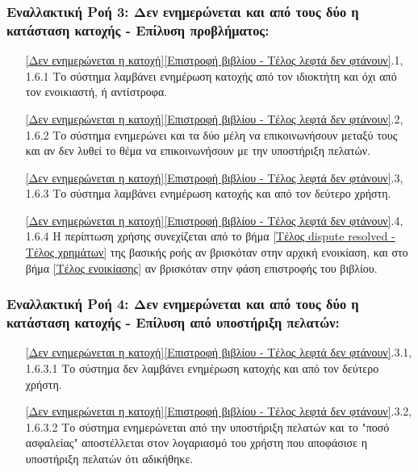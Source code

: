 \documentclass[12pt,a4paper]{article}
\begin{document}
\subsubsection*{Εναλλακτική Ροή 3: Δεν ενημερώνεται και από τους δύο η κατάσταση κατοχής - Επίλυση προβλήματος:}
\begin{enumerate}
    \item[\ref{Δεν ενημερώνεται η κατοχή}\|\ref{Επιστροφή βιβλίου - Τέλος λεφτά δεν φτάνουν}.1, 1.6.1] Το σύστημα λαμβάνει ενημέρωση κατοχής από τον ιδιοκτήτη και όχι από τον ενοικιαστή, ή αντίστροφα.
    \item[\ref{Δεν ενημερώνεται η κατοχή}\|\ref{Επιστροφή βιβλίου - Τέλος λεφτά δεν φτάνουν}.2, 1.6.2] Το σύστημα ενημερώνει και τα δύο μέλη να επικοινωνήσουν μεταξύ τους και αν δεν λυθεί το θέμα να επικοινωνήσουν με την υποστήριξη πελατών.
    \item[\ref{Δεν ενημερώνεται η κατοχή}\|\ref{Επιστροφή βιβλίου - Τέλος λεφτά δεν φτάνουν}.3, 1.6.3] Το σύστημα λαμβάνει ενημέρωση κατοχής και από τον δεύτερο χρήστη.
    \item[\ref{Δεν ενημερώνεται η κατοχή}\|\ref{Επιστροφή βιβλίου - Τέλος λεφτά δεν φτάνουν}.4, 1.6.4] Η περίπτωση χρήσης συνεχίζεται από το βήμα \ref{Τέλος dispute resolved - Τέλος χρημάτων} της βασικής ροής αν βρισκόταν στην αρχική ενοικίαση, και στο βήμα \ref{Τέλος ενοικίασης} αν βρισκόταν στην φάση επιστροφής του βιβλίου.
\end{enumerate}

\subsubsection*{Εναλλακτική Ροή 4: Δεν ενημερώνεται και από τους δύο η κατάσταση κατοχής - Επίλυση από υποστήριξη πελατών:}
\begin{enumerate}
    \item[\ref{Δεν ενημερώνεται η κατοχή}\|\ref{Επιστροφή βιβλίου - Τέλος λεφτά δεν φτάνουν}.3.1, 1.6.3.1] Το σύστημα δεν λαμβάνει ενημέρωση κατοχής και από τον δεύτερο χρήστη.
    \item[\ref{Δεν ενημερώνεται η κατοχή}\|\ref{Επιστροφή βιβλίου - Τέλος λεφτά δεν φτάνουν}.3.2, 1.6.3.2]Το σύστημα ενημερώνεται από την υποστήριξη πελατών και το "ποσό ασφαλείας" αποστέλλεται στον λογαριασμό του χρήστη που αποφάσισε η υποστήριξη πελατών ότι αδικήθηκε.
\end{enumerate}
\end{document}

